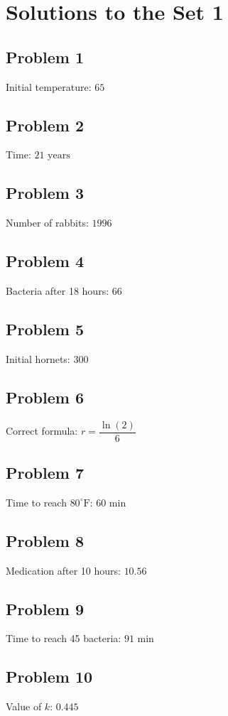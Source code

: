 \documentclass[12pt]{article}
\begin{document}
\newpage
\section*{Solutions to the Set 1}

\subsection*{Problem 1}
\noindent Initial temperature: \(\boxed{65}\)

\subsection*{Problem 2}
\noindent Time: \(\boxed{21 \text{ years}}\)

\subsection*{Problem 3}
\noindent Number of rabbits: \(\boxed{1996}\)

\subsection*{Problem 4}
\noindent Bacteria after 18 hours: \(\boxed{66}\)

\subsection*{Problem 5}
\noindent Initial hornets: \(\boxed{300}\)

\subsection*{Problem 6}
\noindent Correct formula: \(\boxed{r=\dfrac{\ln(2)}{6}}\)

\subsection*{Problem 7}
\noindent Time to reach \(80^\circ\text{F}\): \(\boxed{60\text{ min}}\)

\subsection*{Problem 8}
\noindent Medication after 10 hours: \(\boxed{10.56}\)

\subsection*{Problem 9}
\noindent Time to reach 45 bacteria: \(\boxed{91\text{ min}}\)

\subsection*{Problem 10}
\noindent Value of \(k\): \(\boxed{0.445}\)
\end{document}
